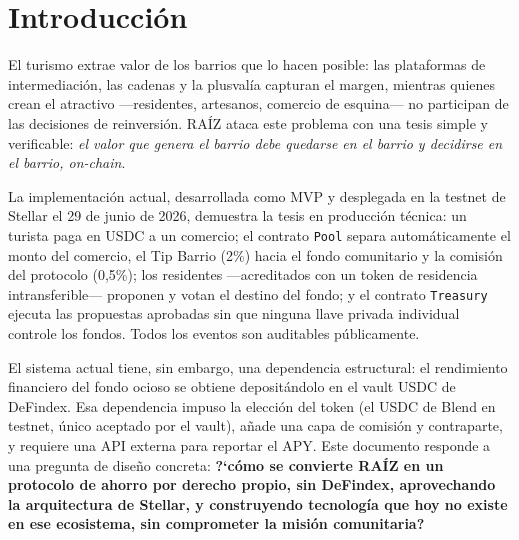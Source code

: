 \documentclass[twocolumn,10pt]{article}
\begin{document}
\section{Introducci\'on}

El turismo extrae valor de los barrios que lo hacen posible: las plataformas de intermediaci\'on, las cadenas y la plusval\'ia capturan el margen, mientras quienes crean el atractivo ---residentes, artesanos, comercio de esquina--- no participan de las decisiones de reinversi\'on. RA\'IZ ataca este problema con una tesis simple y verificable: \emph{el valor que genera el barrio debe quedarse en el barrio y decidirse en el barrio, on-chain}.

La implementaci\'on actual, desarrollada como MVP y desplegada en la testnet de Stellar el 29 de junio de 2026, demuestra la tesis en producci\'on t\'ecnica: un turista paga en USDC a un comercio; el contrato \texttt{Pool} separa autom\'aticamente el monto del comercio, el Tip Barrio (2\%) hacia el fondo comunitario y la comisi\'on del protocolo (0{,}5\%); los residentes ---acreditados con un token de residencia intransferible--- proponen y votan el destino del fondo; y el contrato \texttt{Treasury} ejecuta las propuestas aprobadas sin que ninguna llave privada individual controle los fondos. Todos los eventos son auditables p\'ublicamente.

El sistema actual tiene, sin embargo, una dependencia estructural: el rendimiento financiero del fondo ocioso se obtiene deposit\'andolo en el vault USDC de DeFindex. Esa dependencia impuso la elecci\'on del token (el USDC de Blend en testnet, \'unico aceptado por el vault), a\~nade una capa de comisi\'on y contraparte, y requiere una API externa para reportar el APY. Este documento responde a una pregunta de dise\~no concreta: \textbf{?`c\'omo se convierte RA\'IZ en un protocolo de ahorro por derecho propio, sin DeFindex, aprovechando la arquitectura de Stellar, y construyendo tecnolog\'ia que hoy no existe en ese ecosistema, sin comprometer la misi\'on comunitaria?}
\end{document}
